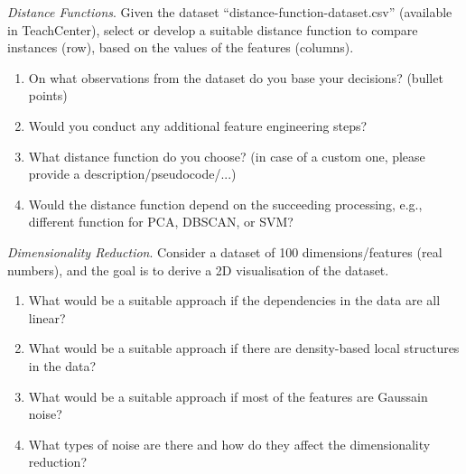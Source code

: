 \documentclass[a4paper,10pt]{article}\setlength{\textheight}{10in}\setlength{\textwidth}{6.5in}\setlength{\topmargin}{-0.125in}\setlength{\oddsidemargin}{-.2in}\setlength{\evensidemargin}{-.2in}\setlength{\headsep}{0.2in}\setlength{\footskip}{0pt}\usepackage{amsmath}\usepackage{fancyhdr}\usepackage{enumitem}\usepackage{hyperref}\usepackage{xcolor}\usepackage{graphicx}\pagestyle{fancy}
\begin{document}
\begin{enumerate}[topsep=0mm, partopsep=0mm, leftmargin=*]

{\color{blue}
\item\textit{Distance Functions}. Given the dataset ``distance-function-dataset.csv'' (available in TeachCenter), select or develop a suitable distance function to compare instances (row), based on the values of the features (columns).
\begin{enumerate}
	\item On what observations from the dataset do you base your decisions? (bullet points)
	\item Would you conduct any additional feature engineering steps?
	\item What distance function do you choose? (in case of a custom one, please provide a description/pseudocode/...)
	\item Would the distance function depend on the succeeding processing, e.g., different function for PCA, DBSCAN, or SVM?
\end{enumerate}
}



{\color{blue}
\newpage\item\textit{Dimensionality Reduction}. Consider a dataset of 100 dimensions/features (real numbers), and the goal is to derive a 2D visualisation of the dataset. 
\begin{enumerate}
	\item What would be a suitable approach if the dependencies in the data are all linear?
	\item What would be a suitable approach if there are density-based local structures in the data?
	\item What would be a suitable approach if most of the features are Gaussain noise?
	\item What types of noise are there and how do they affect the dimensionality reduction?
\end{enumerate}
}





\end{enumerate}
\end{document}
